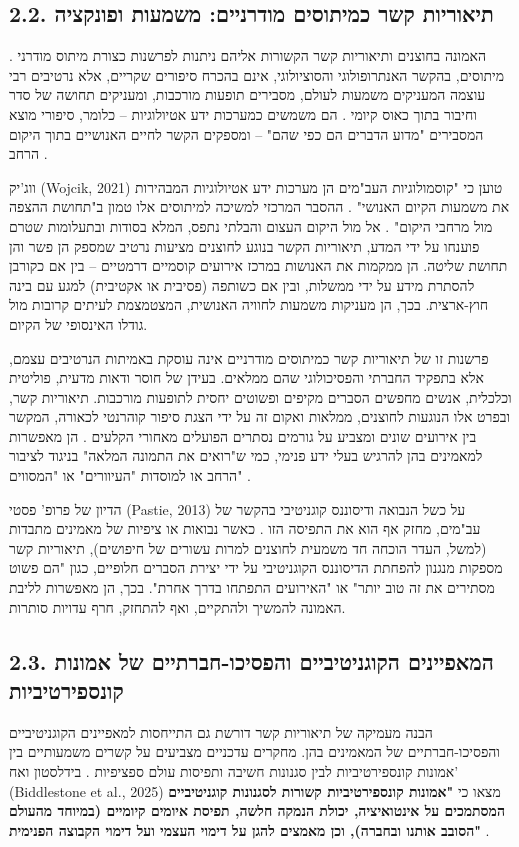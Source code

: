 \documentclass[12pt,a4paper]{article}
\begin{document}
\subsection{2.2. תיאוריות קשר כמיתוסים מודרניים: משמעות ופונקציה}
האמונה בחוצנים ותיאוריות קשר הקשורות אליהם ניתנות לפרשנות כצורת מיתוס מודרני \cite{3}. מיתוסים, בהקשר האנתרופולוגי והסוציולוגי, אינם בהכרח סיפורים שקריים, אלא נרטיבים רבי עוצמה המעניקים משמעות לעולם, מסבירים תופעות מורכבות, ומעניקים תחושה של סדר וחיבור בתוך כאוס קיומי \cite{3}. הם משמשים כמערכות ידע אטיולוגיות – כלומר, סיפורי מוצא המסבירים "מדוע הדברים הם כפי שהם" – ומספקים הקשר לחיים האנושיים בתוך היקום הרחב \cite{3}.

ווג'יק (Wojcik, 2021) טוען כי "קוסמולוגיות העב"מים הן מערכות ידע אטיולוגיות המבהירות את משמעות הקיום האנושי" \cite{3}. ההסבר המרכזי למשיכה למיתוסים אלו טמון ב"תחושת ההצפה מול מרחבי היקום" \cite{3}. אל מול היקום העצום והבלתי נתפס, המלא בסודות ובתעלומות שטרם פוענחו על ידי המדע, תיאוריות הקשר בנוגע לחוצנים מציעות נרטיב שמספק הן פשר והן תחושת שליטה. הן ממקמות את האנושות במרכז אירועים קוסמיים דרמטיים – בין אם כקורבן להסתרת מידע על ידי ממשלות, ובין אם כשותפה (פסיבית או אקטיבית) למגע עם בינה חוץ-ארצית. בכך, הן מעניקות משמעות לחוויה האנושית, המצטמצמת לעיתים קרובות מול גודלו האינסופי של הקיום.

פרשנות זו של תיאוריות קשר כמיתוסים מודרניים אינה עוסקת באמיתות הנרטיבים עצמם, אלא בתפקיד החברתי והפסיכולוגי שהם ממלאים. בעידן של חוסר ודאות מדעית, פוליטית וכלכלית, אנשים מחפשים הסברים מקיפים ופשוטים יחסית לתופעות מורכבות. תיאוריות קשר, ובפרט אלו הנוגעות לחוצנים, ממלאות ואקום זה על ידי הצגת סיפור קוהרנטי לכאורה, המקשר בין אירועים שונים ומצביע על גורמים נסתרים הפועלים מאחורי הקלעים \cite{5}. הן מאפשרות למאמינים בהן להרגיש בעלי ידע פנימי, כמי ש"רואים את התמונה המלאה" בניגוד לציבור הרחב או למוסדות "העיוורים" או "המסווים" \cite{5}.

הדיון של פרופ' פסטי (Pastie, 2013) על כשל הנבואה ודיסוננס קוגניטיבי בהקשר של עב"מים, מחזק אף הוא את התפיסה הזו \cite{4}. כאשר נבואות או ציפיות של מאמינים מתבדות (למשל, העדר הוכחה חד משמעית לחוצנים למרות עשורים של חיפושים), תיאוריות קשר מספקות מנגנון להפחתת הדיסוננס הקוגניטיבי על ידי יצירת הסברים חלופיים, כגון "הם פשוט מסתירים את זה טוב יותר" או "האירועים התפתחו בדרך אחרת". בכך, הן מאפשרות לליבת האמונה להמשיך ולהתקיים, ואף להתחזק, חרף עדויות סותרות.

\subsection{2.3. המאפיינים הקוגניטיביים והפסיכו-חברתיים של אמונות קונספירטיביות}
הבנה מעמיקה של תיאוריות קשר דורשת גם התייחסות למאפיינים הקוגניטיביים והפסיכו-חברתיים של המאמינים בהן. מחקרים עדכניים מצביעים על קשרים משמעותיים בין אמונות קונספירטיביות לבין סגנונות חשיבה ותפיסות עולם ספציפיות \cite{4, 5}. בידלסטון ואח' (Biddlestone et al., 2025) מצאו כי \textbf{"אמונות קונספירטיביות קשורות לסגנונות קוגניטיביים המסתמכים על אינטואיציה, יכולת הנמקה חלשה, תפיסת איומים קיומיים (במיוחד מהעולם הסובב אותנו ובחברה), וכן מאמצים להגן על דימוי העצמי ועל דימוי הקבוצה הפנימית"} \cite{4}.
\end{document}
